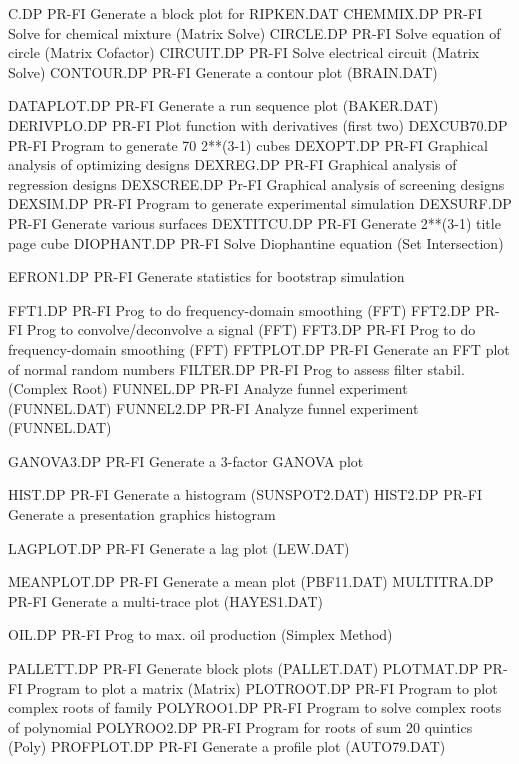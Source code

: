 C.DP                        PR-FI Generate a block plot for RIPKEN.DAT
CHEMMIX.DP                  PR-FI Solve for chemical mixture (Matrix Solve)
CIRCLE.DP                   PR-FI Solve equation of circle (Matrix Cofactor)
CIRCUIT.DP                  PR-FI Solve electrical circuit (Matrix Solve)
CONTOUR.DP                  PR-FI Generate a contour plot (BRAIN.DAT)

DATAPLOT.DP                 PR-FI Generate a run sequence plot (BAKER.DAT)
DERIVPLO.DP                 PR-FI Plot function with derivatives (first two)
DEXCUB70.DP                 PR-FI Program to generate 70 2**(3-1) cubes
DEXOPT.DP                   PR-FI Graphical analysis of optimizing designs
DEXREG.DP                   PR-FI Graphical analysis of regression designs
DEXSCREE.DP                 Pr-FI Graphical analysis of screening designs
DEXSIM.DP                   PR-FI Program to generate experimental simulation
DEXSURF.DP                  PR-FI Generate various surfaces 
DEXTITCU.DP                 PR-FI Generate 2**(3-1) title page cube
DIOPHANT.DP                 PR-FI Solve Diophantine equation (Set Intersection)

EFRON1.DP                   PR-FI Generate statistics for bootstrap simulation

FFT1.DP                     PR-FI Prog to do frequency-domain smoothing (FFT)
FFT2.DP                     PR-FI Prog to convolve/deconvolve a signal (FFT)
FFT3.DP                     PR-FI Prog to do frequency-domain smoothing (FFT)
FFTPLOT.DP                  PR-FI Generate an FFT plot of normal random numbers
FILTER.DP                   PR-FI Prog to assess filter stabil. (Complex Root)
FUNNEL.DP                   PR-FI Analyze funnel experiment (FUNNEL.DAT)
FUNNEL2.DP                  PR-FI Analyze funnel experiment (FUNNEL.DAT)

GANOVA3.DP                  PR-FI Generate a 3-factor GANOVA plot

HIST.DP                     PR-FI Generate a histogram (SUNSPOT2.DAT)
HIST2.DP                    PR-FI Generate a presentation graphics histogram

LAGPLOT.DP                  PR-FI Generate a lag plot (LEW.DAT)

MEANPLOT.DP                 PR-FI Generate a mean plot (PBF11.DAT)
MULTITRA.DP                 PR-FI Generate a multi-trace plot (HAYES1.DAT)

OIL.DP                      PR-FI Prog to max. oil production (Simplex Method)

PALLETT.DP                  PR-FI Generate block plots (PALLET.DAT)
PLOTMAT.DP                  PR-FI Program to plot a matrix (Matrix)
PLOTROOT.DP                 PR-FI Program to plot complex roots of family
POLYROO1.DP                 PR-FI Program to solve complex roots of polynomial
POLYROO2.DP                 PR-FI Program for roots of sum 20 quintics (Poly)
PROFPLOT.DP                 PR-FI Generate a profile plot (AUTO79.DAT)

